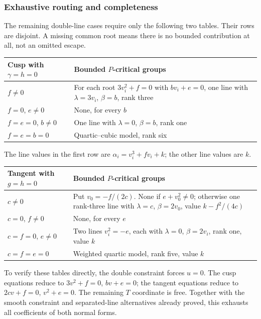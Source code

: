 \subsubsection*{Exhaustive routing and completeness}

The remaining double-line cases require only the following two
tables. Their rows are disjoint. A missing common root means
there is no bounded contribution at all, not an omitted escape.

\begin{center}\small
\begin{tabular}{@{}p{}p{}@{}}
\toprule
Cusp with $\gamma=h=0$ & Bounded $P$-critical groups\\
\midrule
$f\ne0$ & For each root $3v_i^2+f=0$ with $bv_i+e=0$,
one line with $\lambda=3v_i$, $\beta=b$, rank three\\
$f=0$, $e\ne0$ & None, for every $b$\\
$f=e=0$, $b\ne0$ & One line with $\lambda=0$, $\beta=b$, rank one\\
$f=e=b=0$ & Quartic--cubic model, rank six\\
\bottomrule
\end{tabular}
\end{center}
The line values in the first row are
$\alpha_i=v_i^3+fv_i+k$; the other line values are $k$.

\begin{center}\small
\begin{tabular}{@{}p{}p{}@{}}
\toprule
Tangent with $g=h=0$ & Bounded $P$-critical groups\\
\midrule
$c\ne0$ & Put $v_0=-f/(2c)$. None if $e+v_0^2\ne0$;
otherwise one rank-three line with $\lambda=c$, $\beta=2v_0$,
value $k-f^2/(4c)$\\
$c=0$, $f\ne0$ & None, for every $e$\\
$c=f=0$, $e\ne0$ & Two lines $v_i^2=-e$, each with
$\lambda=0$, $\beta=2v_i$, rank one, value $k$\\
$c=f=e=0$ & Weighted quartic model, rank five, value $k$\\
\bottomrule
\end{tabular}
\end{center}

To verify these tables directly, the double constraint forces
$u=0$. The cusp equations reduce to $3v^2+f=0$, $bv+e=0$;
the tangent equations reduce to $2cv+f=0$, $v^2+e=0$.
The remaining $T$ coordinate is free. Together with the smooth
constraint and separated-line alternatives already proved,
this exhausts all coefficients of both normal forms.

